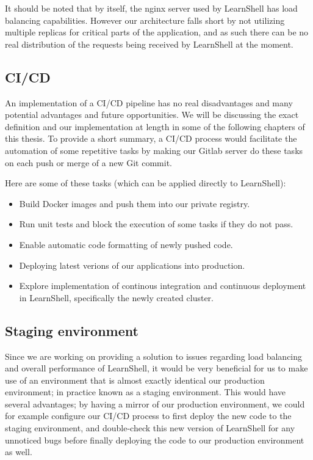 \documentclass[thesis=B,english]{FITthesis}[2019/12/23]
\begin{document}
It should be noted that by itself, the nginx server used by LearnShell has load balancing capabilities. However our architecture falls short by not utilizing multiple replicas for critical parts of the application, and as such there can be no real distribution of the requests being received by LearnShell at the moment.

\subsection{CI/CD}

An implementation of a CI/CD pipeline has no real disadvantages and many potential advantages and future opportunities. We will be discussing the exact definition and our implementation at length in some of the following chapters of this thesis. To provide a short summary, a CI/CD process would facilitate the automation of some repetitive tasks by making our Gitlab server do these tasks on each push or merge of a new Git commit.

Here are some of these tasks (which can be applied directly to LearnShell):

\begin{itemize}
  \setlength\itemsep{0em}
  \item Build Docker images and push them into our private registry.
  \item Run unit tests and block the execution of some tasks if they do not pass.
  \item Enable automatic code formatting of newly pushed code.
  \item Deploying latest verions of our applications into production.
  \item Explore implementation of continous integration and continuous deployment in LearnShell, specifically the newly created cluster.
\end{itemize}

\subsection{Staging environment}

Since we are working on providing a solution to issues regarding load balancing and overall performance of LearnShell, it would be very beneficial for us to make use of an environment that is almost exactly identical our production environment; in practice known as a staging environment. \cite{staging-server} This would have several advantages; by having a mirror of our production environment, we could for example configure our CI/CD process to first deploy the new code to the staging environment, and double-check this new version of LearnShell for any unnoticed bugs before finally deploying the code to our production environment as well. 
\end{document}
